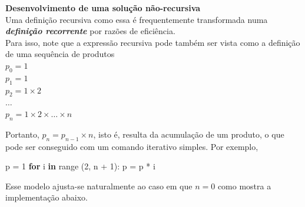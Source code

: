 \documentclass[11pt,a4paper]{article}
\newenvironment{Shaded}{}{}
\newcommand{\KeywordTok}[1]{\textcolor[rgb]{0.00,0.44,0.13}{\textbf{{#1}}}}
\newcommand{\DecValTok}[1]{\textcolor[rgb]{0.25,0.63,0.44}{{#1}}}
\newcommand{\NormalTok}[1]{{#1}}
\newcommand{\ControlFlowTok}[1]{\textcolor[rgb]{0.00,0.44,0.13}{\textbf{{#1}}}}
\newcommand{\OperatorTok}[1]{\textcolor[rgb]{0.40,0.40,0.40}{{#1}}}
\newcommand{\BuiltInTok}[1]{{#1}}
\begin{document}
    \textbf{Desenvolvimento de uma solução não-recursiva}\\
Uma definição recursiva como essa é frequentemente transformada numa
\textbf{\emph{definição recorrente}} por razões de eficiência.\\
Para isso, note que a expressão recursiva pode também ser vista como a
definição de uma sequência de produtos\\
\(p_0 = 1\)\\
\(p_1 = 1\)\\
\(p_2 = 1 \times 2\)\\
\(\ldots\)\\
\(p_n = 1 \times 2 \times \ldots \times n\)

Portanto, \(p_n = p_{n-1} \times n\), isto é, resulta da acumulação de
um produto, o que pode ser conseguido com um comando iterativo simples.
Por exemplo,

\begin{Shaded}
\begin{Highlighting}[]
\NormalTok{p }\OperatorTok{=} \DecValTok{1}
\ControlFlowTok{for}\NormalTok{ i }\KeywordTok{in} \BuiltInTok{range}\NormalTok{ (}\DecValTok{2}\NormalTok{, n }\OperatorTok{+} \DecValTok{1}\NormalTok{):}
\NormalTok{    p }\OperatorTok{=}\NormalTok{ p }\OperatorTok{*}\NormalTok{ i}
\end{Highlighting}
\end{Shaded}

    Esse modelo ajusta-se naturalmente ao caso em que \(n = 0\) como mostra
a implementação abaixo.
\end{document}
